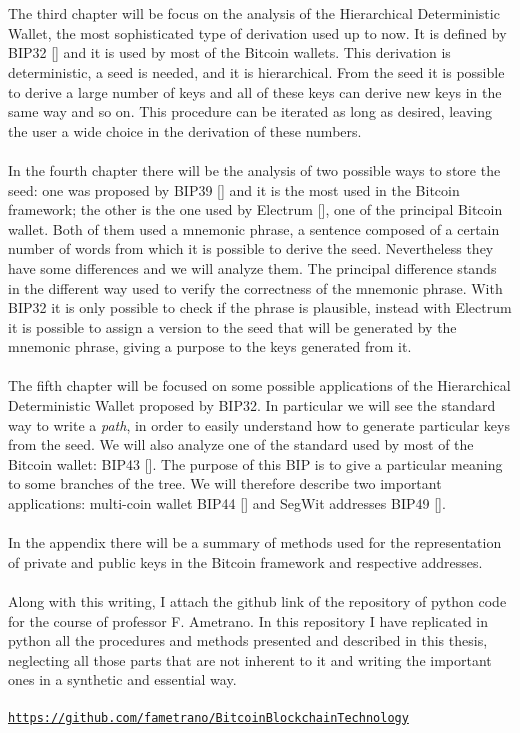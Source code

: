 \\ \\
The third chapter will be focus on the analysis of the Hierarchical Deterministic Wallet, the most sophisticated type of derivation used up to now. It is defined by BIP32 [\cite{1}] and it is used by most of the Bitcoin wallets. This derivation is deterministic, a seed is needed, and it is hierarchical. From the seed it is possible to derive a large number of keys and all of these keys can derive new keys in the same way and so on. This procedure can be iterated as long as desired, leaving the user a wide choice in the derivation of these numbers.
\\ \\
In the fourth chapter there will be the analysis of two possible ways to store the seed: one was proposed by BIP39 [\cite{2}] and it is the most used in the Bitcoin framework; the other is the one used by Electrum [\cite{3}], one of the principal Bitcoin wallet. Both of them used a mnemonic phrase, a sentence composed of a certain number of words from which it is possible to derive the seed. Nevertheless they have some differences and we will analyze them. The principal difference stands in the different way used to verify the correctness of the mnemonic phrase. With BIP32 it is only possible to check if the phrase is plausible, instead with Electrum it is possible to assign a version to the seed that will be generated by the mnemonic phrase, giving a purpose to the keys generated from it.
\\ \\
The fifth chapter will be focused on some possible applications of the Hierarchical Deterministic Wallet proposed by BIP32. In particular we will see the standard way to write a \textit{path}, in order to easily understand how to generate particular keys from the seed.  We will also analyze one of the standard used by most of the Bitcoin wallet: BIP43 [\cite{4}]. The purpose of this BIP is to give a particular meaning to some branches of the tree. We will therefore describe two important applications: multi-coin wallet BIP44 [\cite{5}] and SegWit addresses BIP49 [\cite{6}].
\\ \\
In the appendix there will be a summary of methods used for the representation of private and public keys in the Bitcoin framework and respective addresses.
\\ \\
Along with this writing, I attach the github link of the repository of python code for the course of professor F. Ametrano. In this repository I have replicated in python all the procedures and methods presented and described in this thesis, neglecting all those parts that are not inherent to it and writing the important ones in a synthetic and essential way.
\\ \\
\hypersetup{
	colorlinks=true,
	urlcolor=black
}
\href{https://github.com/fametrano/BitcoinBlockchainTechnology}{\texttt{https://github.com/fametrano/BitcoinBlockchainTechnology}}
